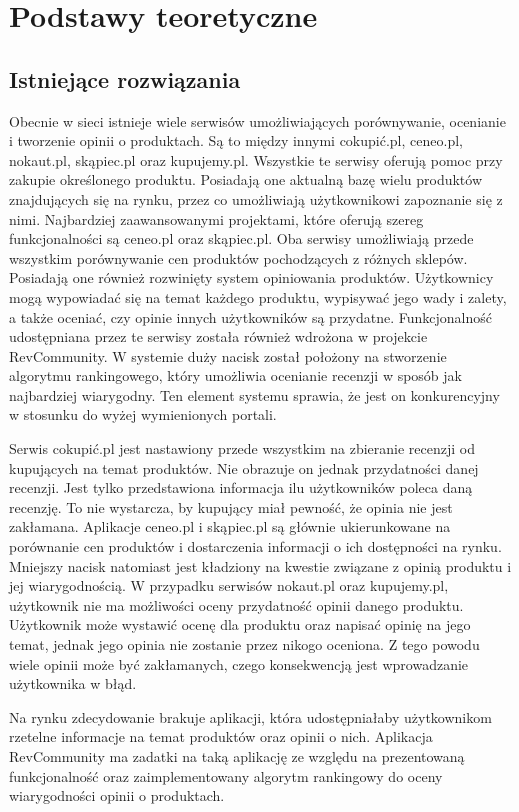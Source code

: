 \chapter{Podstawy teoretyczne}

\section{Istniejące rozwiązania}
\label{sec:rozwiazania}
Obecnie w sieci istnieje wiele serwisów umożliwiających porównywanie, ocenianie i tworzenie opinii o produktach. Są to między innymi cokupić.pl,  ceneo.pl, nokaut.pl, skąpiec.pl oraz kupujemy.pl. Wszystkie te serwisy oferują pomoc przy zakupie określonego produktu. Posiadają one aktualną bazę wielu produktów znajdujących się na rynku, przez co umożliwiają użytkownikowi zapoznanie się z nimi. Najbardziej zaawansowanymi projektami, które oferują szereg funkcjonalności są ceneo.pl oraz skąpiec.pl. Oba serwisy umożliwiają przede wszystkim porównywanie cen produktów pochodzących z różnych sklepów. Posiadają one  również rozwinięty system opiniowania produktów. Użytkownicy mogą wypowiadać się na temat każdego produktu, wypisywać jego wady i zalety, a także oceniać, czy opinie innych użytkowników są przydatne. Funkcjonalność udostępniana przez te serwisy została również wdrożona w projekcie RevCommunity. W systemie duży nacisk został położony na stworzenie algorytmu rankingowego, który umożliwia ocenianie recenzji w sposób jak najbardziej wiarygodny. Ten element systemu sprawia, że jest on konkurencyjny w stosunku do wyżej wymienionych portali. 

Serwis cokupić.pl jest nastawiony przede wszystkim na zbieranie recenzji od kupujących na temat produktów. Nie obrazuje on jednak przydatności danej recenzji. Jest tylko przedstawiona informacja ilu użytkowników poleca daną recenzję. To nie wystarcza, by kupujący miał pewność, że opinia nie jest zakłamana. Aplikacje ceneo.pl i skąpiec.pl są głównie ukierunkowane na porównanie cen produktów i dostarczenia informacji o ich dostępności na rynku. Mniejszy nacisk natomiast jest kładziony na kwestie związane z opinią produktu i jej wiarygodnością.  W przypadku serwisów nokaut.pl oraz kupujemy.pl, użytkownik nie ma możliwości oceny przydatność opinii danego produktu. Użytkownik może wystawić ocenę dla produktu oraz napisać opinię na jego temat, jednak jego opinia nie zostanie przez nikogo oceniona. Z tego powodu wiele opinii może być zakłamanych, czego konsekwencją jest wprowadzanie użytkownika w błąd. 

Na rynku zdecydowanie brakuje aplikacji, która udostępniałaby użytkownikom rzetelne informacje na temat produktów oraz opinii o nich. Aplikacja RevCommunity ma zadatki na taką aplikację ze względu na prezentowaną funkcjonalność oraz zaimplementowany algorytm rankingowy do oceny wiarygodności opinii o produktach. 



